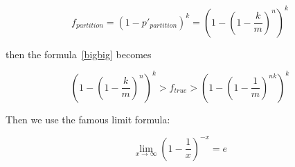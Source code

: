 \begin{equation}
f_{partition}=(1-p'_{partition})^k=\left( 1- \left( 1-\dfrac{k}{m} \right)^n \right) ^k
\end{equation}

then the formula~\ref{bigbig} becomes

\begin{equation}
\left( 1- \left( 1-\dfrac{k}{m} \right)^n \right) ^k > f_{true} > \left( 1- \left( 1-\dfrac{1}{m} \right)^{nk} \right) ^k
\end{equation}

Then we use the famous limit formula:

\begin{equation}
\lim\limits_{x \to \infty} \left( 1-\dfrac{1}{x}\right) ^{-x} = e
\end{equation}




